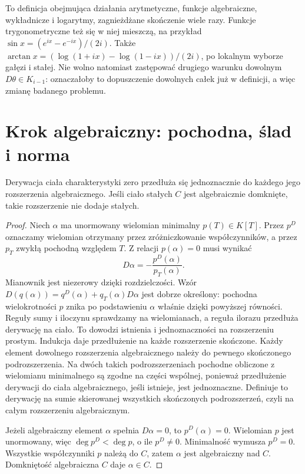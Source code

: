 To definicja obejmująca działania arytmetyczne, funkcje algebraiczne, wykładnicze i logarytmy, zagnieżdżane skończenie wiele razy. Funkcje trygonometryczne też się w niej mieszczą, na przykład $\sin x=(e^{ix}-e^{-ix})/(2i)$. Także $\arctan x=(\log(1+ix)-\log(1-ix))/(2i)$, po lokalnym wyborze gałęzi i stałej. Nie wolno natomiast zastępować drugiego warunku dowolnym $D\theta\in K_{i-1}$: oznaczałoby to dopuszczenie dowolnych całek już w definicji, a więc zmianę badanego problemu.

\section{Krok algebraiczny: pochodna, ślad i norma}

\begin{lemat}
Derywacja ciała charakterystyki zero przedłuża się jednoznacznie do każdego jego rozszerzenia algebraicznego. Jeśli ciało stałych $C$ jest algebraicznie domknięte, takie rozszerzenie nie dodaje stałych.
\end{lemat}
\begin{proof}
Niech $\alpha$ ma unormowany wielomian minimalny $p(T)\in K[T]$. Przez $p^D$ oznaczamy wielomian otrzymany przez zróżniczkowanie współczynników, a przez $p_T$ zwykłą pochodną względem $T$. Z relacji $p(\alpha)=0$ musi wynikać
\[
D\alpha=-\frac{p^D(\alpha)}{p_T(\alpha)}.
\]
Mianownik jest niezerowy dzięki rozdzielczości. Wzór $D(q(\alpha))=q^D(\alpha)+q_T(\alpha)D\alpha$ jest dobrze określony: pochodna wielokrotności $p$ znika po podstawieniu $\alpha$ właśnie dzięki powyższej równości. Reguły sumy i iloczynu sprawdzamy na wielomianach, a reguła ilorazu przedłuża derywację na ciało. To dowodzi istnienia i jednoznaczności na rozszerzeniu prostym. Indukcja daje przedłużenie na każde rozszerzenie skończone. Każdy element dowolnego rozszerzenia algebraicznego należy do pewnego skończonego podrozszerzenia. Na dwóch takich podrozszerzeniach pochodne obliczone z wielomianu minimalnego są zgodne na części wspólnej, ponieważ przedłużenie derywacji do ciała algebraicznego, jeśli istnieje, jest jednoznaczne. Definiuje to derywację na sumie skierowanej wszystkich skończonych podrozszerzeń, czyli na całym rozszerzeniu algebraicznym.

Jeżeli algebraiczny element $\alpha$ spełnia $D\alpha=0$, to $p^D(\alpha)=0$. Wielomian $p$ jest unormowany, więc $\deg p^D<\deg p$, o ile $p^D\ne0$. Minimalność wymusza $p^D=0$. Wszystkie współczynniki $p$ należą do $C$, zatem $\alpha$ jest algebraiczny nad $C$. Domkniętość algebraiczna $C$ daje $\alpha\in C$.
\end{proof}

